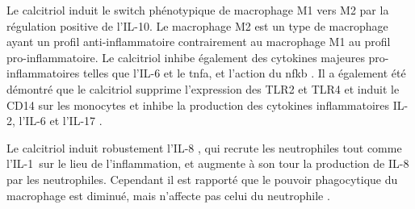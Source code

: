 \documentclass[
  a4paper,
  DIV=11,
  numbers=noendperiod,
  listof=totoc]{scrreprt}
\begin{document}
Le calcitriol induit le switch phénotypique de macrophage M1 vers M2 par
la régulation positive de l'\ac{IL-10}. Le macrophage M2 est un type de
macrophage ayant un profil anti-inflammatoire contrairement au
macrophage M1 au profil pro-inflammatoire. Le calcitriol inhibe
également des cytokines majeures pro-inflammatoires telles que
l'\ac{IL-6} et le \ac{tnfa}, et l'action du \ac{nfkb}
\autocite{Meza-Meza.2022,Caprio.2017}. Il a également été démontré que
le calcitriol supprime l'expression des \ac{TLR}2 et \ac{TLR}4 et induit
le CD14 sur les monocytes \autocite{Bishop.2021} et inhibe la production
des cytokines inflammatoires \ac{IL-2}, l'\ac{IL-6} et l'\ac{IL-17}
\autocite{Meza-Meza.2022,Caprio.2017}.

Le calcitriol induit robustement l'IL-8 \autocite{Bishop.2021}, qui
recrute les neutrophiles tout comme l'IL-1\mupbeta ~sur le lieu de
l'inflammation, et augmente à son tour la production de IL-8 par les
neutrophiles. Cependant il est rapporté que le pouvoir phagocytique du
macrophage est diminué, mais n'affecte pas celui du neutrophile
\autocite{Chen.2017}.
\end{document}
